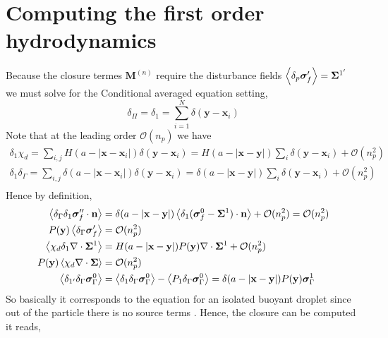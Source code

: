 \documentclass[12pt]{My_preprint}
\begin{document}
\section{Computing the first order hydrodynamics}

Because the closure termes $\textbf{M}^{(n)}$ require the disturbance fields $\left<\delta_{p} \bm\sigma_f'\right>= \bm\Sigma^{1'}$ we must solve for the Conditional averaged equation setting, 
\begin{equation}
    \delta_\Pi = \delta_1 = \sum_{i=1}^{N}\delta(\textbf{y} - \textbf{x}_i) 
\end{equation}
Note that at the leading order $\mathcal{O}(n_p)$ we have 
\begin{align}
    \delta_1 \chi_d
    =
    \sum_{i,j} H(a- |\textbf{x} - \textbf{x}_i|)\delta(\textbf{y} - \textbf{x}_i) 
    =
    H(a- |\textbf{x} - \textbf{y}|)
    \sum_i \delta(\textbf{y} - \textbf{x}_i)+ \mathcal{O}( n_p^2)\\ 
    \delta_1 \delta_\Gamma
    =
    \sum_{i,j} \delta(a- |\textbf{x} - \textbf{x}_i|)\delta(\textbf{y} - \textbf{x}_i) 
    =
    \delta(a- |\textbf{x} - \textbf{y}|)
    \sum_i \delta(\textbf{y} - \textbf{x}_i)+\mathcal{O}( n_p^2)\\ 
\end{align}
Hence by definition, 
\begin{align}
    \left<\delta_\Gamma \delta_1 \bm\sigma_f''\cdot \textbf{n}\right>
    &=
    \delta(a- |\textbf{x} - \textbf{y}|) \left<\delta_1 (\bm\sigma_f^0 - \bm\Sigma^1)\cdot \textbf{n}\right>
    + \mathcal{O}( n_p^2)
    = 
    \mathcal{O}( n_p^2)\\
    P(\textbf{y})\left<\delta_\Gamma  \bm\sigma_f'\right>
    &=
    \mathcal{O}( n_p^2)\\
    \left<\chi_d \delta_1 \mathbf{\nabla}\cdot\bm\Sigma^1\right>
    &=
    H(a- |\textbf{x}-\textbf{y}|) P(\textbf{y}) \mathbf{\nabla}\cdot\bm\Sigma^{1}
    + 
    \mathcal{O}( n_p^2)\\
    P(\textbf{y})\left<\chi_d \mathbf{\nabla}\cdot\bm\Sigma\right>
    &=
    \mathcal{O}( n_p^2)\\
    \left<\delta_{1'} \delta_\Gamma \bm\sigma_\Gamma^0\right>
    &=
    \left<\delta_1 \delta_\Gamma \bm\sigma_\Gamma^0\right>
    - \left<P_1 \delta_\Gamma \bm\sigma_\Gamma^0\right>
    =
    \delta(a -|\textbf{x} - \textbf{y}|)P(\textbf{y})\bm\sigma_\Gamma^1
\end{align}
So basically it corresponds to the equation for an isolated buoyant droplet since out of the particle there is no source terms . 
Hence, the closure can be computed it reads, 
\end{document}
